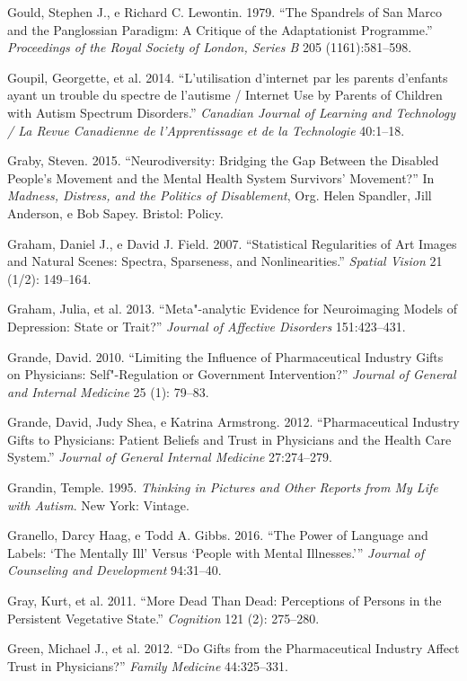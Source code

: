 Gould, Stephen J., e Richard C. Lewontin. 1979. ``The Spandrels of San
Marco and the Panglossian Paradigm: A Critique of the Adaptationist
Programme.'' \emph{Proceedings of the Royal Society of London, Series B}
205 (1161):581--598.

Goupil, Georgette, et al. 2014. ``L'utilisation d'internet par les
parents d'enfants ayant un trouble du spectre de l'autisme / Internet
Use by Parents of Children with Autism Spectrum Disorders.''
\emph{Canadian Journal of Learning and Technology / La Revue Canadienne
de l'Apprentissage et de la Technologie} 40:1--18.

Graby, Steven. 2015. ``Neurodiversity: Bridging the Gap Between the
Disabled People's Movement and the Mental Health System Survivors'
Movement?'' In \emph{Madness, Distress, and the Politics of
Disablement}, Org. Helen Spandler, Jill Anderson, e Bob Sapey. Bristol:
Policy.

Graham, Daniel J., e David J. Field. 2007. ``Statistical Regularities of
Art Images and Natural Scenes: Spectra, Sparseness, and
Nonlinearities.'' \emph{Spatial Vision} 21 (1/2): 149--164.

Graham, Julia, et al. 2013. ``Meta"-analytic Evidence for Neuroimaging
Models of Depression: State or Trait?'' \emph{Journal of Affective
Disorders} 151:423--431.

Grande, David. 2010. ``Limiting the Influence of Pharmaceutical Industry
Gifts on Physicians: Self"-Regulation or Government Intervention?''
\emph{Journal of General and Internal Medicine} 25 (1): 79--83.

Grande, David, Judy Shea, e Katrina Armstrong. 2012. ``Pharmaceutical
Industry Gifts to Physicians: Patient Beliefs and Trust in Physicians
and the Health Care System.'' \emph{Journal of General Internal
Medicine} 27:274--279.

Grandin, Temple. 1995. \emph{Thinking in Pictures and Other Reports from
My Life with Autism}. New York: Vintage.

Granello, Darcy Haag, e Todd A. Gibbs. 2016. ``The Power of Language and
Labels: `The Mentally Ill' Versus `People with Mental Illnesses.'''
\emph{Journal of Counseling and Development} 94:31--40.

Gray, Kurt, et al. 2011. ``More Dead Than Dead: Perceptions of Persons
in the Persistent Vegetative State.'' \emph{Cognition} 121 (2):
275--280.

Green, Michael J., et al. 2012. ``Do Gifts from the Pharmaceutical
Industry Affect Trust in Physicians?'' \emph{Family Medicine}
44:325--331.

